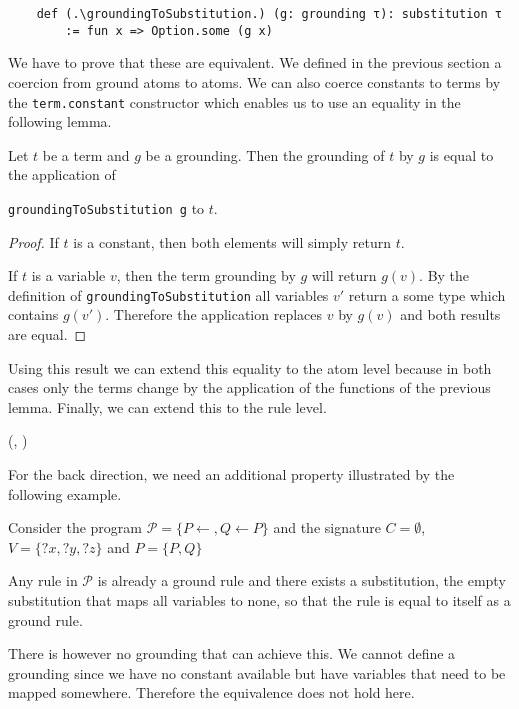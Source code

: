     \begin{lstlisting}
    def (.\groundingToSubstitution.) (g: grounding τ): substitution τ
        := fun x => Option.some (g x)
    \end{lstlisting}

    We have to prove that these are equivalent. We defined in the previous section a coercion from ground atoms to atoms. We can also coerce constants to terms by the \lstinline|term.constant| constructor which enables us to use an equality in the following lemma.

    \begin{lemma}[\groundingToSubsitutionEquivTerm]
        Let $t$ be a term and $g$ be a grounding. Then the grounding of $t$ by $g$ is equal to the application of
        
        \lstinline|groundingToSubstitution g| to $t$.
    \end{lemma}
    \begin{proof}
        If $t$ is a constant, then both elements will simply return $t$.

        If $t$ is a variable $v$, then the term grounding by $g$ will return $g(v)$. By the definition of \lstinline|groundingToSubstitution| all variables $v'$ return a some type which contains $g(v')$. Therefore the application replaces $v$ by $g(v)$ and both results are equal. 
    \end{proof}

    Using this result we can extend this equality to the atom level because in both cases only the terms change by the application of the functions of the previous lemma. Finally, we can extend this to the rule level.
    
    \noindent(\groundingToSubsitutionEquivAtom, \groundingToSubsitutionEquivRule)

    For the back direction, we need an additional property illustrated by the following example.
    \begin{example}
        Consider the program $\mathcal{P} = \{P \leftarrow, Q \leftarrow P\}$ and the signature $C = \emptyset$, $V = \{?x,?y,?z \}$ and $P = \{P,Q\}$

        Any rule in $\mathcal{P}$ is already a ground rule and there exists a substitution, the empty substitution that maps all variables to none, so that the rule is equal to itself as a ground rule.
        
        There is however no grounding that can achieve this. We cannot define a grounding since we have no constant available but have variables that need to be mapped somewhere. Therefore the equivalence does not hold here.
    \end{example}

